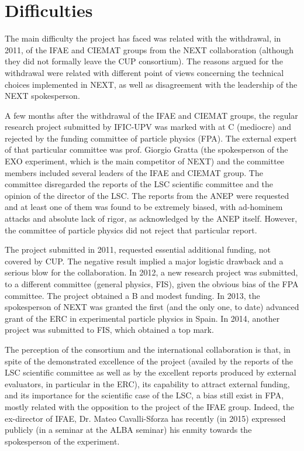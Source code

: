 \documentclass[a4paper,11pt,oneside]{article}
\begin{document}
%

\section{\bf \textsf{ Difficulties}} 
\label{sec.diff}
The main difficulty the project has faced was related with the withdrawal, in 2011, of the IFAE and CIEMAT groups from the NEXT collaboration (although they did not formally leave the CUP consortium). The reasons argued for the withdrawal were related with different point of views concerning the technical choices implemented in NEXT, as well as disagreement with the leadership of the NEXT spokesperson.

A few months after the withdrawal of the IFAE and CIEMAT groups, the regular research project submitted by IFIC-UPV was marked with at C (mediocre) and rejected by the funding committee of particle physics (FPA). The external expert of that particular committee was prof. Giorgio Gratta (the spokesperson of the EXO experiment, which is the main competitor of NEXT) and the committee members included several leaders of the IFAE and CIEMAT group. The committee disregarded the reports of the LSC scientific committee and the opinion of the director of the LSC. The reports from the ANEP were requested and at least one of them was found to be extremely biased, with ad-hominem attacks and absolute lack of rigor, as acknowledged by the ANEP itself. However, the committee of particle physics did not reject that particular report.

The project submitted in 2011, requested essential additional funding, not covered by CUP. The negative result implied a major logistic drawback and a serious blow for the collaboration. In 2012, a new research project was submitted, to a different committee (general physics, FIS), given the obvious bias of the FPA committee. The project obtained a B and modest funding. In 2013, the spokesperson of NEXT was granted the first (and the only one, to date) advanced grant of the ERC in experimental particle physics in Spain. In 2014, another project was submitted to FIS, which obtained a top mark. 

The perception of the consortium and the international collaboration is that, in spite of the demonstrated excellence of the project (availed by the reports of the LSC scientific committee as well as by the excellent reports produced by external evaluators, in particular in the ERC), its capability to attract external funding, and its importance for the scientific case of the LSC, a bias still exist in FPA, mostly related with the opposition to the project of the IFAE group. Indeed, the ex-director of IFAE, Dr. Mateo Cavalli-Sforza has recently (in 2015) expressed publicly (in a seminar at the ALBA seminar) his enmity towards the spokesperson of the experiment. 
\end{document}

